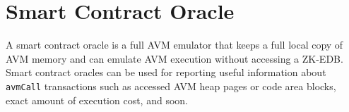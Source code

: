 \documentclass[11pt, A4]{report}
\begin{document}
    \section{Smart Contract Oracle}\label{sec:smart-contract-oracle}

    A smart contract oracle is a full AVM emulator that keeps a full local copy of AVM memory and can emulate AVM
    execution without accessing a ZK-EDB. Smart contract oracles can be used for reporting useful information about
    \texttt{avmCall} transactions such as accessed AVM heap pages or code area blocks, exact amount of execution cost,
    and soon.
\end{document}
